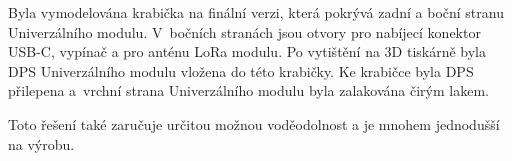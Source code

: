 Byla vymodelována krabička na finální verzi, která pokrývá zadní a boční stranu Univerzálního modulu. V~bočních stranách jsou otvory pro nabíjecí konektor USB-C, vypínač a pro anténu LoRa modulu. Po vytištění 
na 3D tiskárně byla DPS Univerzálního modulu vložena do této krabičky. Ke krabičce byla DPS přilepena a~vrchní strana Univerzálního modulu byla zalakována čirým lakem. 

Toto řešení také zaručuje určitou možnou voděodolnost a je mnohem jednodušší na výrobu. 





